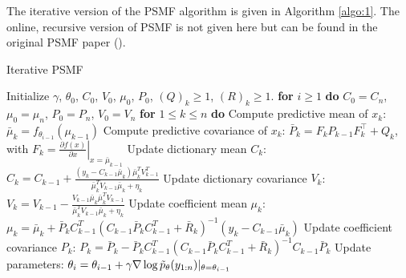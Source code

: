 \documentclass{mldsmsc}
\begin{document}
The iterative version of the PSMF algorithm is given in Algorithm \ref{algo:1}. The online, recursive version of PSMF is not given here but can be found in the original PSMF paper (\cite{akyildiz2021probabilistic}).

\begin{algorithm}[H]
\caption{Iterative PSMF}
\begin{algorithmic}[1]
\State Initialize $\gamma$, $\theta_0$, $C_0$, $V_0$, $\mu_0$, $P_0$, $(Q)_k{\geq1}$, $(R)_k{\geq1}$.
\State \textbf{for} $i \geq 1$ \textbf{do}
\State \hspace{1em} $C_0 = C_n$, $\mu_0 = \mu_n$, $P_0 = P_n$, $V_0 = V_n$
\State \hspace{1em} \textbf{for} $1 \leq k \leq n$ \textbf{do}
\State \hspace{2em} Compute predictive mean of $x_k$:
\State \hspace{3em} $\bar{\mu}_k = f_{\theta_{i-1}}(\mu_{k-1})$
\State \hspace{2em} Compute predictive covariance of $x_k$:
\State \hspace{3em} $\bar{P}_k = F_k P_{k-1} F_k^\top + Q_k$, with $F_k = \left. \frac{\partial f(x)}{\partial x} \right|_{x=\bar{\mu}_{k-1}}$
\State \hspace{2em} Update dictionary mean $C_k$:
\State \hspace{3em} $C_k = C_{k-1} + \frac{(y_k - C_{k-1} \bar{\mu}_k) \bar{\mu}_k^T V_{k-1}^T}{\bar{\mu}_k^T V_{k-1} \bar{\mu}_k + \eta_k}$
\State \hspace{2em} Update dictionary covariance $V_k$:
\State \hspace{3em} $V_k = V_{k-1} - \frac{V_{k-1} \bar{\mu}_k \bar{\mu}_k^T V_{k-1}}{\bar{\mu}_k^T V_{k-1} \bar{\mu}_k + \eta_k}$
\State \hspace{2em} Update coefficient mean $\mu_k$:
\State \hspace{3em} $\mu_k = \bar{\mu}_k + \bar{P}_k C_{k-1}^T (C_{k-1} \bar{P}_k C_{k-1}^T + \bar{R}_k)^{-1} (y_k - C_{k-1} \bar{\mu}_k)$
\State \hspace{2em} Update coefficient covariance $P_k$:
\State \hspace{3em} $P_k = \bar{P}_k - \bar{P}_k C_{k-1}^T (C_{k-1} \bar{P}_k C_{k-1}^T + \bar{R}_k)^{-1} C_{k-1} \bar{P}_k$
\State \hspace{1em} Update parameters:
\State \hspace{2em} $\theta_i = \theta_{i-1} + \gamma \nabla \log \Tilde{p}_{\theta}(y_{1:n}) \vert_{\theta = \theta_{i-1}}$
\end{algorithmic}\label{algo:1}
\end{algorithm}
\end{document}
